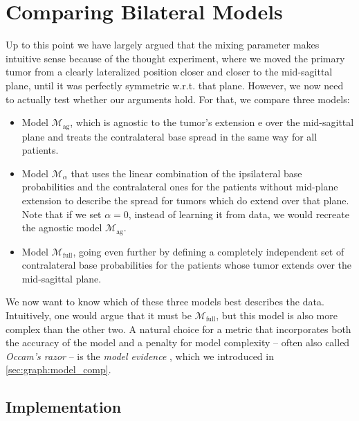 \documentclass[\relativeRoot/main.tex]{subfiles}
\begin{document}
\section{Comparing Bilateral Models}
\label{sec:bilateral:model_comp}

Up to this point we have largely argued that the mixing parameter makes intuitive sense because of the thought experiment, where we moved the primary tumor from a clearly lateralized position closer and closer to the mid-sagittal plane, until it was perfectly symmetric w.r.t. that plane. However, we now need to actually test whether our arguments hold. For that, we compare three models:

\begin{itemize}
    \item Model $\mathcal{M}_\text{ag}$, which is agnostic to the tumor's extension $\text{e}$ over the mid-sagittal plane and treats the contralateral base spread in the same way for all patients.
    \item Model $\mathcal{M}_\alpha$ that uses the linear combination of the ipsilateral base probabilities and the contralateral ones for the patients without mid-plane extension to describe the spread for tumors which do extend over that plane. Note that if we set $\alpha = 0$, instead of learning it from data, we would recreate the agnostic model $\mathcal{M}_\text{ag}$.
    \item Model $\mathcal{M}_\text{full}$, going even further by defining a completely independent set of contralateral base probabilities for the patients whose tumor extends over the mid-sagittal plane.
\end{itemize}

We now want to know which of these three models best describes the data. Intuitively, one would argue that it must be $\mathcal{M}_\text{full}$, but this model is also more complex than the other two. A natural choice for a metric that incorporates both the accuracy of the model and a penalty for model complexity -- often also called \emph{Occam's razor} -- is the \emph{model evidence} \cite{aponte_introduction_2022}, which we introduced in \cref{sec:graph:model_comp}.

\subsection{Implementation}
\label{subsec:bilateral:model_comp:implementation}


\end{document}
